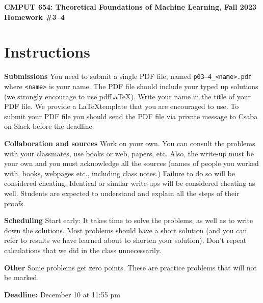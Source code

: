 \documentclass{article}
\newcommand{\hwnumber}{3--4}
\DeclareMathOperator*{\1}{\mathbbm{1}}
\theoremstyle{definition}
\theoremstyle{remark}
\begin{document}
\begin{center}
{\Large \textbf{CMPUT 654: Theoretical Foundations of Machine Learning, Fall 2023\\ Homework \#\hwnumber}}
\end{center}

\section*{Instructions}
\textbf{Submissions}
You need to submit a single PDF file, named {\tt p0\hwnumber\_<name>.pdf} where {\tt <name>} is your name.
The PDF file should include your typed up solutions (we strongly encourage to use pdf\LaTeX). 
Write your name in the title of your PDF file.
We provide a \LaTeX template that you are encouraged to use.
To submit your PDF file you should send the PDF file via private message to Csaba on Slack before the deadline.


\textbf{Collaboration and sources}
Work on your own. You can consult the problems with your classmates, use books
or web, papers, etc.
Also, the write-up must be your own and you must acknowledge all the
sources (names of people you worked with, books, webpages etc., including class notes.) 
Failure to do so will be considered cheating.  
Identical or similar write-ups will be considered cheating as well.
Students are expected to understand and explain all the steps of their proofs.

\textbf{Scheduling}
Start early: It takes time to solve the problems, as well as to write down the solutions. Most problems should have a short solution (and you can refer to results we have learned about to shorten your solution). Don't repeat calculations that we did in the class unnecessarily.

\textbf{Other}
Some problems get zero points. These are practice problems that will not be marked.

\vspace{0.3cm}

\textbf{Deadline:} December 10 at 11:55 pm

\newcommand{\cM}{\mathcal{M}}
\newcommand{\nS}{\mathrm{S}}
\newcommand{\nA}{\mathrm{A}}
\newcommand{\PP}{\mathbb{P}}
\newcommand{\RR}{\mathbb{R}}
\newcommand{\cX}{\mathcal{X}}
\newcommand{\cE}{\mathcal{E}}
\newcommand{\cY}{\mathcal{Y}}
\newcommand{\cZ}{\mathcal{Z}}
\newcommand{\cG}{\mathcal{G}}
\newcommand{\cD}{\mathcal{D}}
\newcommand{\cN}{\mathcal{N}}
\newcommand{\ip}[1]{\langle #1 \rangle}
\newcommand{\one}[1]{\mathbb{I}\{#1\}}
\newcommand{\KL}{\mathrm{KL}}
\end{document}
